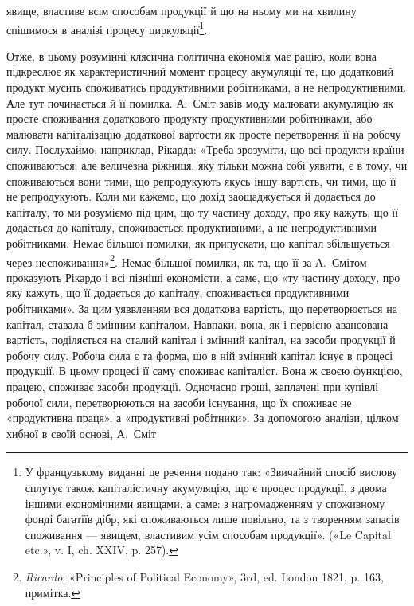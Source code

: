 \parcont{}  %
явище, властиве всім способам продукції й що на ньому ми на
хвилину спішимося в аналізі процесу циркуляції\footnote*{
У французькому виданні це речення подано так: «Звичайний спосіб
вислову сплутує також капіталістичну акумуляцію, що є процес
продукції, з двома іншими економічними явищами, а саме: з нагромадженням
у споживному фонді багатіїв дібр, які споживаються лише
повільно, та з творенням запасів споживання — явищем, властивим усім
способам продукції». («Le Capital etc.», v. I, ch. XXIV, p. 257). 
}.

Отже, в цьому розумінні клясична політична економія має
рацію, коли вона підкреслює як характеристичний момент процесу
акумуляції те, що додатковий продукт мусить споживатись
продуктивними робітниками, а не непродуктивними. Але тут починається
й її помилка. А.~Сміт завів моду малювати акумуляцію як
просте споживання додаткового продукту продуктивними робітниками,
або малювати капіталізацію додаткової вартости як просте
перетворення її на робочу силу. Послухаймо, наприклад, Рікарда:
«Треба зрозуміти, що всі продукти країни споживаються; але величезна
ріжниця, яку тільки можна собі уявити, є в тому, чи споживаються
вони тими, що репродукують якусь іншу вартість, чи тими,
що її не репродукують. Коли ми кажемо, що дохід заощаджується
й додається до капіталу, то ми розуміємо під цим, що ту частину
доходу, про яку кажуть, що її додається до капіталу, споживається
продуктивними, а не непродуктивними робітниками. Немає
більшої помилки, як припускати, що капітал збільшується через
неспоживання»\footnote{
\emph{Ricardo}: «Principles of Political Economy», 3rd, ed. London
1821, p. 163, примітка.
}. Немає більшої помилки, як та, що її за
А.~Смітом проказують Рікардо і всі пізніші економісти, а саме,
що «ту частину доходу, про яку кажуть, що її додається до капіталу,
споживається продуктивними робітниками». За цим уяввленням
вся додаткова вартість, що перетворюється на капітал,
ставала б змінним капіталом. Навпаки, вона, як і первісно авансована
вартість, поділяється на сталий капітал і змінний капітал,
на засоби продукції й робочу силу. Робоча сила є та форма, що
в ній змінний капітал існує в процесі продукції. В цьому процесі
її саму споживає капіталіст. Вона ж своєю функцією, працею,
споживає засоби продукції. Одночасно гроші, заплачені при
купівлі робочої сили, перетворюються на засоби існування, що
їх споживає не «продуктивна праця», а «продуктивні робітники».
За допомогою аналізи, цілком хибної в своїй основі, А.~Сміт
